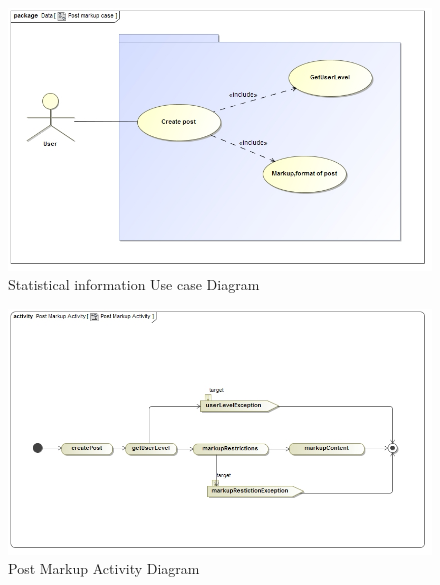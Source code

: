 \documentclass[11pt]{article}
\begin{document}
\begin{enumerate}
\graphicspath{ {../Diagrams/Matt/Case/} }
	  \begin{figure}[H]	
    	\includegraphics[scale=0.5]{Postmarkupcase.jpg}
    	\caption{Statistical information Use case Diagram}
	\end{figure}

\graphicspath{ {../Diagrams/Matt/Activity/} }
	  \begin{figure}[H]	
    	\includegraphics[scale=0.5]{PostMarkupActivity.jpg}
    	\caption{Post Markup Activity Diagram}
	\end{figure}
	

\end{enumerate}
\end{document}

